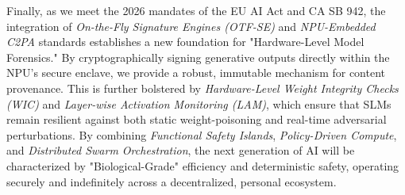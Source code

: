 \documentclass[twocolumn,10pt]{article}
\begin{document}
Finally, as we meet the 2026 mandates of the EU AI Act and CA SB 942, the integration of \textit{On-the-Fly Signature Engines (OTF-SE)} and \textit{NPU-Embedded C2PA} standards establishes a new foundation for "Hardware-Level Model Forensics." By cryptographically signing generative outputs directly within the NPU's secure enclave, we provide a robust, immutable mechanism for content provenance. This is further bolstered by \textit{Hardware-Level Weight Integrity Checks (WIC)} and \textit{Layer-wise Activation Monitoring (LAM)}, which ensure that SLMs remain resilient against both static weight-poisoning and real-time adversarial perturbations. By combining \textit{Functional Safety Islands}, \textit{Policy-Driven Compute}, and \textit{Distributed Swarm Orchestration}, the next generation of AI will be characterized by "Biological-Grade" efficiency and deterministic safety, operating securely and indefinitely across a decentralized, personal ecosystem.



\end{document}
